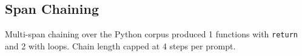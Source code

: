 \subsection{Span Chaining}
Multi-span chaining over the Python corpus produced 1 functions with \texttt{return} and
2 with loops. Chain length capped at 4 steps per prompt.

